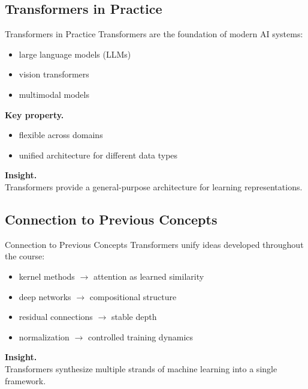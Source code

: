 \documentclass[aspectratio=169,11pt]{beamer}
\begin{document}
\subsection{Transformers in Practice}
\begin{frame}[t,allowframebreaks]{Transformers in Practice}
\small
Transformers are the foundation of modern AI systems:

\begin{itemize}
    \item large language models (LLMs)
    \item vision transformers
    \item multimodal models
\end{itemize}

\textbf{Key property.}\\ \begin{itemize}
    \item flexible across domains
    \item unified architecture for different data types
\end{itemize}

\textbf{Insight.}\\ Transformers provide a general-purpose architecture for learning representations.
\end{frame}

\subsection{Connection to Previous Concepts}
\begin{frame}[t,allowframebreaks]{Connection to Previous Concepts}
\small
Transformers unify ideas developed throughout the course:

\begin{itemize}
    \item kernel methods $\rightarrow$ attention as learned similarity
    \item deep networks $\rightarrow$ compositional structure
    \item residual connections $\rightarrow$ stable depth
    \item normalization $\rightarrow$ controlled training dynamics
\end{itemize}

\textbf{Insight.}\\ Transformers synthesize multiple strands of machine learning into a single framework.
\end{frame}
\end{document}
